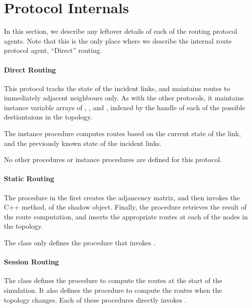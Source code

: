 \section{Protocol Internals}
\label{sec:protocol-internals}

In this section, we describe any leftover details of each of the routing
protocol agents.
Note that this is the only place where we describe the
internal route protocol agent, ``Direct'' routing.

\paragraph{Direct Routing}
This protocol tracks the state of the incident links,
and maintains routes to immediately adjacent neighbours only.
As with the other protocols, it maintains instance variable arrays
of , , and , indexed by 
the handle of each of the possible destiantaions in the topology.

The instance procedure
computes routes based on the current state of the link, and the previously
known state of the incident links.

No other procedures or instance procedures are defined for this protocol.

\paragraph{Static Routing}
The procedure
in the 
first creates the adjancency matrix, and then
invokes the C++ method,  of the shadow object.
Finally, the procedure retrieves the result of the route computation,
and inserts the appropriate routes at each of the nodes in the topology.

The class only defines the procedure
that invokes .

\paragraph{Session Routing}
The class defines the procedure
to compute the routes at the start of the simulation.
It also defines the procedure
to compute the routes when the topology changes.
Each of these procedures directly invokes .

